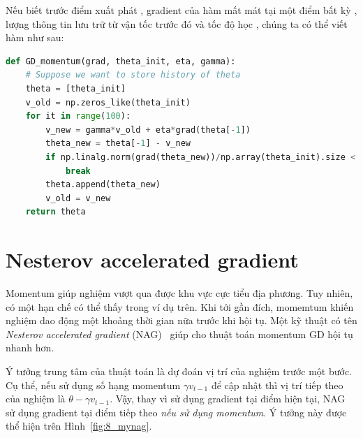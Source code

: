 Nếu biết trước điểm xuất phát , gradient của hàm mất mát tại
một điểm bất kỳ , lượng thông tin lưu trữ từ vận tốc
trước đó  và tốc độ học , chúng ta có thể
viết hàm  như sau:%
\newpage 
\begin{lstlisting}[language=Python]
def GD_momentum(grad, theta_init, eta, gamma):
    # Suppose we want to store history of theta
    theta = [theta_init]
    v_old = np.zeros_like(theta_init)
    for it in range(100):
        v_new = gamma*v_old + eta*grad(theta[-1])
        theta_new = theta[-1] - v_new
        if np.linalg.norm(grad(theta_new))/np.array(theta_init).size < 1e-3:
            break
        theta.append(theta_new)
        v_old = v_new
    return theta 
\end{lstlisting}
 
 
\section{Nesterov accelerated gradient}
Momentum giúp nghiệm vượt qua được khu vực cực tiểu địa phương. Tuy nhiên, có
một hạn chế có thể thấy trong ví dụ trên. Khi tới gần đích, momemtum khiến
nghiệm dao động một khoảng thời gian nữa trước khi hội tụ. Một kỹ thuật có tên
\textit{Nesterov accelerated gradient} (NAG)~\cite{nesterov2007gradient} giúp
cho thuật toán momentum GD hội tụ nhanh hơn.
 
 
Ý tưởng trung tâm của thuật toán là {dự đoán vị trí của nghiệm trước một bước}.
Cụ thể, nếu sử dụng số hạng {momentum} $\gamma v_{t-1}$ để cập nhật thì vị trí
tiếp theo của nghiệm là $\theta - \gamma v_{t-1}$. Vậy, thay vì sử dụng gradient
tại điểm hiện tại, NAG sử dụng gradient tại điểm tiếp theo \textit{nếu sử dụng
momentum}. Ý tưởng này được thể hiện trên Hình~\ref{fig:8_mynag}.
 
